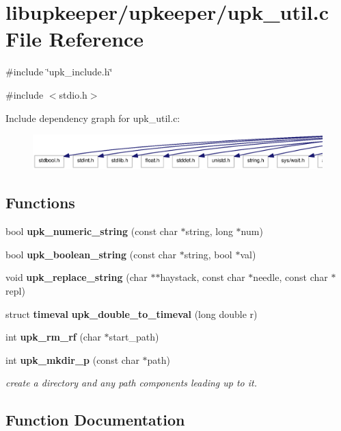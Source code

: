 \section{libupkeeper/upkeeper/upk\_\-util.c File Reference}
\label{upk__util_8c}
{\ttfamily \#include \char`\"{}upk\_\-include.h\char`\"{}}\par
{\ttfamily \#include $<$stdio.h$>$}\par
Include dependency graph for upk\_\-util.c:\nopagebreak
\begin{figure}[H]
\begin{center}
\leavevmode
\includegraphics[width=400pt]{upk__util_8c__incl}
\end{center}
\end{figure}
\subsection*{Functions}
\begin{DoxyCompactItemize}
\item 
bool {\bf upk\_\-numeric\_\-string} (const char $\ast$string, long $\ast$num)
\item 
bool {\bf upk\_\-boolean\_\-string} (const char $\ast$string, bool $\ast$val)
\item 
void {\bf upk\_\-replace\_\-string} (char $\ast$$\ast$haystack, const char $\ast$needle, const char $\ast$repl)
\item 
struct {\bf timeval} {\bf upk\_\-double\_\-to\_\-timeval} (long double r)
\item 
int {\bf upk\_\-rm\_\-rf} (char $\ast$start\_\-path)
\item 
int {\bf upk\_\-mkdir\_\-p} (const char $\ast$path)
\begin{DoxyCompactList}\small\item\em create a directory and any path components leading up to it. \end{DoxyCompactList}\end{DoxyCompactItemize}


\subsection{Function Documentation}
